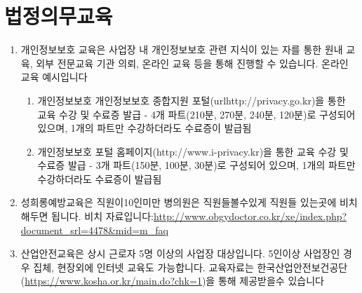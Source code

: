 \section*{법정의무교육}

\begin{enumerate}[1)]\tightlist
\item 개인정보보호 교육은 사업장 내 개인정보보호 관련 지식이 있는 자를 통한 원내 교육, 외부 전문교육 기관 의뢰, 온라인 교육 등을 통해 진행할 수 있습니다. 온라인 교육 예시입니다
	\begin{enumerate}[①]\tightlist
	\item 개인정보보호 개인정보보호 종합지원 포털(url{http://privacy.go.kr})을 통한 교육 수강 및 수료증 발급 \newline
     - 4개 파트(210분, 270분, 240분, 120분)로 구성되어 있으며, 1개의 파트만 수강하더라도 수료증이 발급됨
	\item 개인정보보호 포털 홈페이지(http://www.i-privacy.kr)을 통한 교육 수강 및 수료증 발급 \newline
     - 3개 파트(150분, 100분, 30분)로 구성되어 있으며, 1개의 파트만 수강하더라도 수료증이 발급됨
	\end{enumerate}

\item 성희롱예방교육은 직원이10인미만  병의원은 직원들볼수있게 직원들 있는곳에 비치해두면 됩니다. 비치 자료입니다:\url{http://www.obgydoctor.co.kr/xe/index.php?document_srl=4478&mid=m_faq}

\item 산업안전교육은 상시 근로자 5명 이상의 사업장 대상입니다. 5인이상 사업장인 경우 집체, 현장외에 인터넷 교육도 가능합니다. 교육자료는  한국산업안전보건공단(\url{https://www.kosha.or.kr/main.do?chk=1})을 통해 제공받을수 있습니다
\end{enumerate}